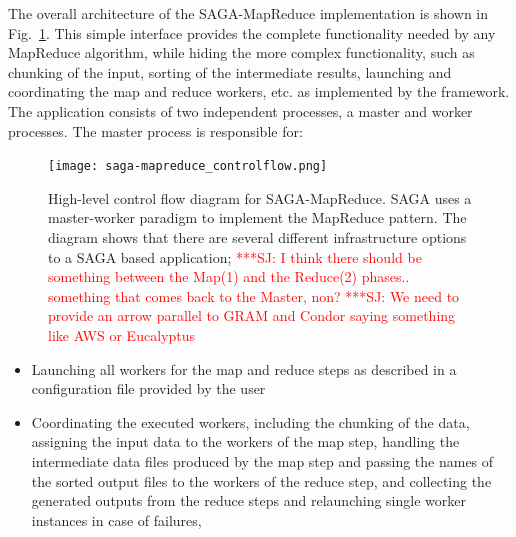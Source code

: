 \documentclass[conference,final]{IEEEtran}
\newcommand{\jhanote}[1]{ {\textcolor{red} { ***SJ: #1 }}}
\newcommand{\jhanote}[1]{}
\begin{document}
The overall architecture of the SAGA-MapReduce implementation is shown
in Fig.~\ref{saga-mapreduce_controlflow}. This simple interface
provides the complete functionality needed by any MapReduce algorithm,
while hiding the more complex functionality, such as chunking of the
input, sorting of the intermediate results, launching and coordinating
the map and reduce workers, etc. as implemented by the framework.  The
application consists of two independent processes, a master and worker
processes. The master process is responsible for:

\begin{figure}[t]
\centering
\texttt{[image: saga-mapreduce\_controlflow.png]}
\caption{High-level control flow diagram for SAGA-MapReduce. SAGA uses
  a master-worker paradigm to implement the MapReduce pattern. The
  diagram shows that there are several different infrastructure
  options to a SAGA based
  application; %
  \jhanote{I think there should be something between the Map(1) and
    the Reduce(2) phases.. something that comes back to the Master,
    non?} \jhanote{We need to provide an arrow parallel to GRAM and
    Condor saying something like AWS or Eucalyptus}} \vspace{-2em}
      \label{saga-mapreduce_controlflow}
\end{figure}

\begin{itemize}
\item Launching all workers for the map and reduce steps as described
  in a configuration file provided by the user 
\item Coordinating the executed workers, including the chunking of the
  data, assigning the input data to the workers of the map step,
  handling the intermediate data files produced by the map step and
  passing the names of the sorted output files to the workers of the
  reduce step, and collecting the generated outputs from the reduce
  steps and relaunching single worker instances in case of failures,
\end{itemize}
\end{document}
